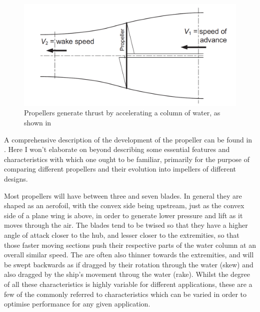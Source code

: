 \documentclass{article}\usepackage[]{graphicx}\usepackage[]{color}
\begin{document}
\begin{figure}
\includegraphics[width=\textwidth]{PropellerAction.png}
\caption{Propellers generate thrust by accelerating a column of water, as shown in  \parencite[247]{mollard2011}}
\label{fig:PropellerAction.png}
\end{figure}


A comprehensive description of the development of the propeller can be found in \cite{carlton2007}.  Here I won't elaborate on beyond describing some essential features and characteristics with which one ought to be familiar, primarily for the purpose of comparing different propellers and their evolution into impellers of different designs.

Most propellers will have between three and seven blades.  In general they are shaped as an aerofoil, with the convex side being upstream, just as the convex side of a plane wing is above, in order to generate lower pressure and lift as it moves through the air.  The blades tend to be twised so that they have a higher angle of attack closer to the hub, and lesser closer to the extremities, so that those faster moving sections push their respective parts of the water column at an overall similar speed.  The are often also thinner towards the extremities, and will be swept backwards as if dragged by their rotation through the water (skew) and also dragged by the ship's movement throug the water (rake). Whilst the degree of all these characteristics is highly variable for different applications, these are a few of the commonly referred to characteristics which can be varied in order to optimise performance for any given application.
\end{document}
